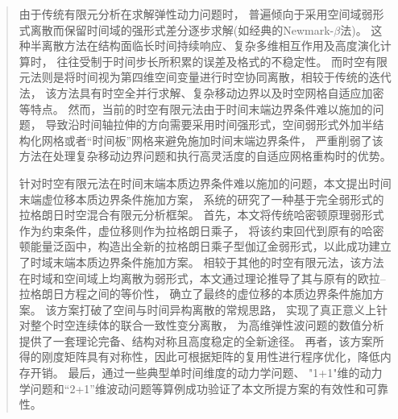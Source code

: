 \begin{abstract}
    由于传统有限元分析在求解弹性动力问题时，
    普遍倾向于采用空间域弱形式离散而保留时间域的强形式差分逐步求解(如经典的Newmark-$\beta$法)。
    这种半离散方法在结构面临长时间持续响应、复杂多维相互作用及高度演化计算时，
    往往受制于时间步长所积累的误差及格式的不稳定性。
    而时空有限元法则是将时间视为第四维空间变量进行时空协同离散，相较于传统的迭代法，
    该方法具有时空全并行求解、复杂移动边界以及时空网格自适应加密等特点。
    然而，当前的时空有限元法由于时间末端边界条件难以施加的问题，
    导致沿时间轴拉伸的方向需要采用时间强形式，空间弱形式外加半结构化网格或者“时间板”网格来避免施加时间末端边界条件，
    严重削弱了该方法在处理复杂移动边界问题和执行高灵活度的自适应网格重构时的优势。
    
    针对时空有限元法在时间末端本质边界条件难以施加的问题，本文提出时间末端虚位移本质边界条件施加方案，
    系统的研究了一种基于完全弱形式的拉格朗日时空混合有限元分析框架。
    首先，本文将传统哈密顿原理弱形式作为约束条件，虚位移则作为拉格朗日乘子，
    将该约束回代到原有的哈密顿能量泛函中，构造出全新的拉格朗日乘子型伽辽金弱形式，以此成功建立了时域末端本质边界条件施加方案。
    相较于其他的时空有限元法，该方法在时域和空间域上均离散为弱形式，本文通过理论推导了其与原有的欧拉--拉格朗日方程之间的等价性，
    确立了最终的虚位移的本质边界条件施加方案。
    该方案打破了空间与时间异构离散的常规思路，
    实现了真正意义上针对整个时空连续体的联合一致性变分离散，
    为高维弹性波问题的数值分析提供了一套理论完备、结构对称且高度稳定的全新途径。
    再者，该方案所得的刚度矩阵具有对称性，因此可根据矩阵的复用性进行程序优化，降低内存开销。
    最后，通过一些典型单时间维度的动力学问题、
    "1+1"维的动力学问题和“2+1”维波动问题等算例成功验证了本文所提方案的有效性和可靠性。

\end{abstract}



